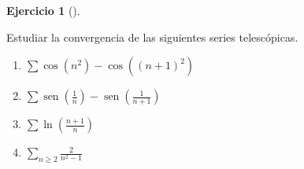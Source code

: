 \documentclass[
  a4paper,
]{scrreport}
\theoremstyle{definition}
\newtheorem{exercise}{Ejercicio}[chapter]
\theoremstyle{remark}
\begin{document}
\begin{exercise}[]\protect\hypertarget{exr-series-telescopicas}{}\label{exr-series-telescopicas}

Estudiar la convergencia de las siguientes series telescópicas.

\begin{enumerate}
\def\labelenumi{\alph{enumi}.}
\item
  \(\sum \cos(n^2)-\cos((n+1)^2)\)
\item
  \(\sum \operatorname{sen}\left(\frac{1}{n}\right)-\operatorname{sen}\left(\frac{1}{n+1}\right)\)
\item
  \(\sum \ln\left(\frac{n+1}{n}\right)\)
\item
  \(\sum_{n\geq 2} \frac{2}{n^2-1}\)
\end{enumerate}

\end{exercise}
\end{document}
